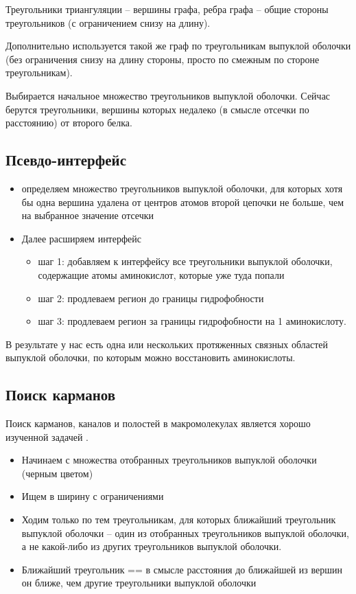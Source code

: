 Треугольники триангуляции -- вершины графа, ребра графа -- общие стороны треугольников (с ограничением снизу на длину).

Дополнительно используется такой же граф по треугольникам выпуклой оболочки (без ограничения снизу на длину стороны, просто по смежным по стороне треугольникам).

Выбирается начальное множество треугольников выпуклой оболочки. Сейчас берутся треугольники, вершины которых недалеко (в смысле отсечки по расстоянию) от второго белка.

\subsection{Псевдо-интерфейс}
\begin{itemize}
\item определяем множество треугольников выпуклой оболочки, для которых хотя бы одна вершина удалена от центров атомов второй цепочки не больше, чем на выбранное значение отсечки
\item Далее расширяем интерфейс
\begin{itemize}
\item шаг 1: добавляем к интерфейсу все треугольники выпуклой оболочки, содержащие атомы аминокислот, которые уже туда попали
\item шаг 2: продлеваем регион до границы гидрофобности
\item шаг 3: продлеваем регион за границы гидрофобности на 1 аминокислоту.
\end{itemize}
\end{itemize}


В результате у нас есть одна или нескольких протяженных связных областей выпуклой оболочки, по которым можно восстановить аминокислоты.
\subsection{Поиск карманов}
Поиск карманов, каналов и полостей в макромолекулах является хорошо изученной задачей \cite{alpha_shapes1995, alpha_shapes1998, caver, ppi_kim2006}.  

\begin{itemize}
\item Начинаем с множества отобранных треугольников выпуклой оболочки (черным цветом)
\item Ищем в ширину с ограничениями
\item Ходим только по тем треугольникам, для которых ближайший треугольник выпуклой оболочки -- один из отобранных треугольников выпуклой оболочки, а не какой-либо из других треугольников выпуклой оболочки.
\item Ближайший треугольник == в смысле расстояния до ближайшей из вершин он ближе, чем другие треугольники выпуклой оболочки
\end{itemize}
\cite{alpha_shapes1995, alpha_shapes1998}
